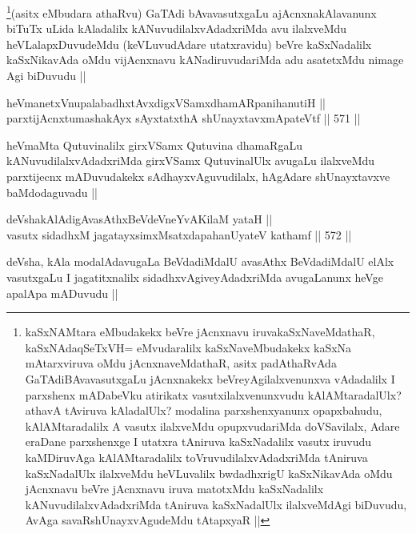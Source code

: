 \begin{artha}
\footnote{kaSxNAMtara eMbudakekx beVre jAcnxnavu iruvakaSxNaveMdathaR, kaSxNAdaqSeTxVH= eMvudaralilx kaSxNaveMbudakekx kaSxNa mAtarxviruva oMdu jAcnxnaveMdathaR, asitx padAthaRvAda GaTAdiBAvavasutxgaLu jAcnxnakekx beVreyAgilalxvenunxva vAdadalilx I parxshenx mADabeVku atirikatx vasutxilalxvenunxvudu kAlAMtaradalUlx? athavA tAviruva kAladalUlx? modalina parxshenxyanunx opapxbahudu, kAlAMtaradalilx A vasutx ilalxveMdu opupxvudariMda doVSavilalx, Adare eraDane parxshenxge I utatxra tAniruva kaSxNadalilx vasutx iruvudu kaMDiruvAga kAlAMtaradalilx toVruvudilalxvAdadxriMda tAniruva kaSxNadalUlx ilalxveMdu heVLuvalilx bwdadhxrigU kaSxNikavAda oMdu jAcnxnavu beVre jAcnxnavu iruva matotxMdu kaSxNadalilx kANuvudilalxvAdadxriMda tAniruva kaSxNadalUlx ilalxveMdAgi biDuvudu, AvAga savaRshUnayxvAgudeMdu tAtapxyaR ||}(asitx eMbudara athaRvu) GaTAdi bAvavasutxgaLu ajAcnxnakAlavanunx biTuTx uLida kAladalilx kANuvudilalxvAdadxriMda avu ilalxveMdu heVLalapxDuvudeMdu (keVLuvudAdare utatxravidu) beVre kaSxNadalilx kaSxNikavAda oMdu vijAcnxnavu kANadiruvudariMda adu asatetxMdu nimage Agi biDuvudu ||
\end{artha}


\begin{shl}
heVmanetxV\s nupalabadhxtAvxdigxVSamxdhamARpanihanutiH || \\
parxtijAcnxtumashakAyx sAyxtatxthA shUnayxtavxmApateVtf ||  571 ||  
\end{shl}

\begin{artha}
heVmaMta Qutuvinalilx girxVSamx Qutuvina dhamaRgaLu kANuvudilalxvAdadxriMda girxVSamx QutuvinalUlx avugaLu ilalxveMdu parxtijecnx mADuvudakekx sAdhayxvAguvudilalx, hAgAdare shUnayxtavxve baMdodaguvadu ||
\end{artha}


\begin{shl}
deVshakAlAdigAvasAthxBeVdeVneYvAKilaM yataH || \\
vasutx sidadhxM jagatayxsimxMsatxdapahanUyateV kathamf ||  572 ||  
\end{shl}

\begin{artha}
deVsha, kAla modalAdavugaLa BeVdadiMdalU avasAthx BeVdadiMdalU elAlx vasutxgaLu I jagatitxnalilx sidadhxvAgiveyAdadxriMda avugaLanunx heVge apalApa mADuvudu ||
\end{artha}

